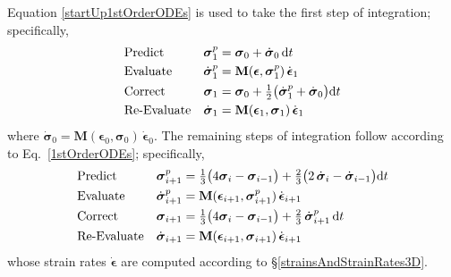 Equation \ref{startUp1stOrderODEs} is used to take the first step of integration; specifically, 
\begin{subequations}
    \notag
    \begin{align}
    \mbox{} & \text{Predict} & 
    \boldsymbol{\sigma}_1^p & = \boldsymbol{\sigma}_0 + \dot{\boldsymbol{\sigma}}_0 \, \mathrm{d}t \\
    \mbox{} & \text{Evaluate} & 
    \dot{\boldsymbol{\sigma}}^p_1 & = \mathbf{M} ( \boldsymbol{\epsilon} , \boldsymbol{\sigma}_1^p ) \, \dot{\boldsymbol{\epsilon}}_1 \\
    \mbox{} & \text{Correct} &
    \boldsymbol{\sigma}_1 & = \boldsymbol{\sigma}_0 + \tfrac{1}{2} 
    \bigl( \dot{\boldsymbol{\sigma}}_1^p + 
    \dot{\boldsymbol{\sigma}}_0 \bigr) \mathrm{d} t \\
    \mbox{} & \text{Re-Evaluate} & 
    \dot{\boldsymbol{\sigma}}_1 & = \mathbf{M} ( \boldsymbol{\epsilon}_1 , \boldsymbol{\sigma}_1 ) \, \dot{\boldsymbol{\epsilon}}_1
    \end{align}
\end{subequations}
where $\dot{\boldsymbol{\sigma}}_0 = \mathbf{M} ( \boldsymbol{\epsilon}_0 , \boldsymbol{\sigma}_0 ) \, \dot{\boldsymbol{\epsilon}}_0$.  The remaining steps of integration follow according to Eq.~\ref{1stOrderODEs}; specifically,
\begin{subequations}
    \notag
    \begin{align}
    \mbox{} & \text{Predict} & 
    \boldsymbol{\sigma}_{i+1}^p & = \tfrac{1}{3} 
    \bigl( 4 \boldsymbol{\sigma}_i - \boldsymbol{\sigma}_{i-1} \bigr) + 
    \tfrac{2}{3} \bigl( 2 \, \dot{\boldsymbol{\sigma}}_i - 
    \dot{\boldsymbol{\sigma}}_{i-1} \bigr) \mathrm{d} t \\
    \mbox{} & \text{Evaluate} & 
    \dot{\boldsymbol{\sigma}}^p_{i+1} & = \mathbf{M} ( \boldsymbol{\epsilon}_{i+1} , \boldsymbol{\sigma}_{i+1}^p ) \, \dot{\boldsymbol{\epsilon}}_{i+1} \\
    \mbox{} & \text{Correct} &
    \boldsymbol{\sigma}_{i+1} & = \tfrac{1}{3} 
    \bigl( 4 \boldsymbol{\sigma}_i - \boldsymbol{\sigma}_{i-1} \bigr) + 
    \tfrac{2}{3} \, \dot{\boldsymbol{\sigma}}^{p}_{i+1} \, \mathrm{d}t \\
    \mbox{} & \text{Re-Evaluate} & 
    \dot{\boldsymbol{\sigma}}_{i+1} & = \mathbf{M} ( \boldsymbol{\epsilon}_{i+1} , 
    \boldsymbol{\sigma}_{i+1} ) \, \dot{\boldsymbol{\epsilon}}_{i+1}
    \end{align}
\end{subequations} 
whose strain rates $\dot{\boldsymbol{\epsilon}}$ are computed according to \S\ref{strainsAndStrainRates3D}.


